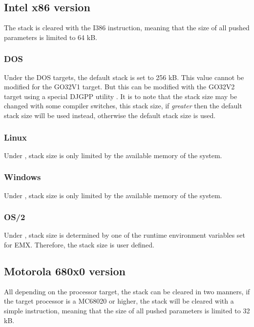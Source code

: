 \subsection{Intel x86 version}

The stack is cleared with the  I386 instruction, meaning that the
size of all pushed parameters is limited to 64 kB.

\subsubsection{DOS}

Under the DOS targets, the default stack is set to 256 kB. This value
cannot be modified for the GO32V1 target. But this can be modified
with the GO32V2 target using a special DJGPP utility .
It is to note that the stack size may be changed with some compiler
switches, this stack size, if \emph{greater} then the default stack
size will be used instead, otherwise the default stack size is used.

\subsubsection{Linux}

Under \linux, stack size is only limited by the available memory of
the system.

\subsubsection{Windows}

Under \windows, stack size is only limited by the available memory of
the system.

\subsubsection{OS/2}

Under \ostwo, stack size is determined by one of the runtime
environment variables set for EMX. Therefore, the stack size
is user defined.

\subsection{Motorola 680x0 version}

All depending on the processor target, the stack can be cleared in two
manners, if the target processor is a MC68020 or higher, the stack will
be cleared with a simple  instruction, meaning that the size
of all pushed parameters is limited to 32 kB.

